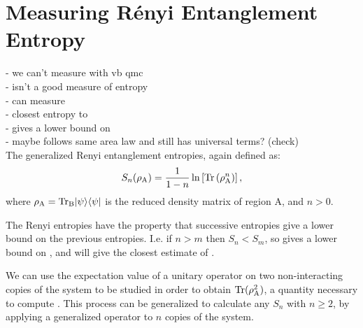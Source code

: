 \chapter{Measuring R\'{e}nyi Entanglement Entropy}

\noindent
- we can't measure \vn with vb qmc\\
- \vb isn't a good measure of entropy\\
- can measure \re\\
 - closest entropy to \vn\\
 - gives a lower bound on \vn\\
 - maybe follows same area law and still has universal terms? (check)\\
 
The generalized Renyi entanglement entropies, again defined as:
\begin{equation} \label{renyis}
 	S_n(\rho_{\rm A}) = \frac{1}{1-n}\ln\left[{\rm Tr}\left( \rho_{\rm A}^n \right) \right],
\end{equation}
where $\rho_{\rm{A}}=\rm{Tr}_B\lvert {\psi} \rangle\langle {\psi} \rvert$ is the reduced density matrix of region A, and $n>0$.




The Renyi entropies have the property that successive entropies give a lower bound on the previous entropies.  I.e. if $n>m$ then $S_n<S_m$, so \re gives a lower bound on \vN, and \re will give the closest estimate of \vN.

We can use the expectation value of a unitary \sw operator on two non-interacting copies of the system to be studied in order to obtain ${\rm Tr}(\rho_{\rm A}^2)$, a quantity necessary to compute \re.  
This process can be generalized to calculate any $S_n$ with $n \ge 2$, by applying a generalized \sw operator to $n$ copies of the system. 

